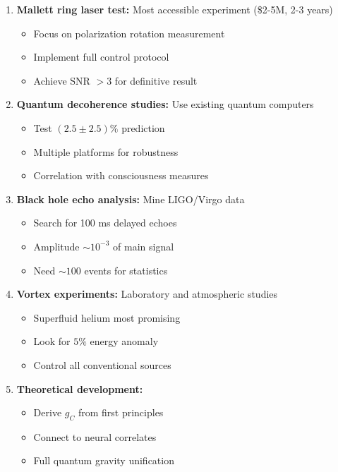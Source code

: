 \documentclass[11pt]{article}
\theoremstyle{definition}
\begin{document}
\begin{enumerate}
\item \textbf{Mallett ring laser test:} Most accessible experiment (\$2-5M, 2-3 years)
   \begin{itemize}
   \item Focus on polarization rotation measurement
   \item Implement full control protocol
   \item Achieve SNR $> 3$ for definitive result
   \end{itemize}

\item \textbf{Quantum decoherence studies:} Use existing quantum computers
   \begin{itemize}
   \item Test $(2.5 \pm 2.5)\%$ prediction
   \item Multiple platforms for robustness
   \item Correlation with consciousness measures
   \end{itemize}

\item \textbf{Black hole echo analysis:} Mine LIGO/Virgo data
   \begin{itemize}
   \item Search for 100 ms delayed echoes
   \item Amplitude $\sim 10^{-3}$ of main signal
   \item Need $\sim 100$ events for statistics
   \end{itemize}

\item \textbf{Vortex experiments:} Laboratory and atmospheric studies
   \begin{itemize}
   \item Superfluid helium most promising
   \item Look for $5\%$ energy anomaly
   \item Control all conventional sources
   \end{itemize}

\item \textbf{Theoretical development:}
   \begin{itemize}
   \item Derive $g_C$ from first principles
   \item Connect to neural correlates
   \item Full quantum gravity unification
   \end{itemize}
\end{enumerate}
\end{document}
